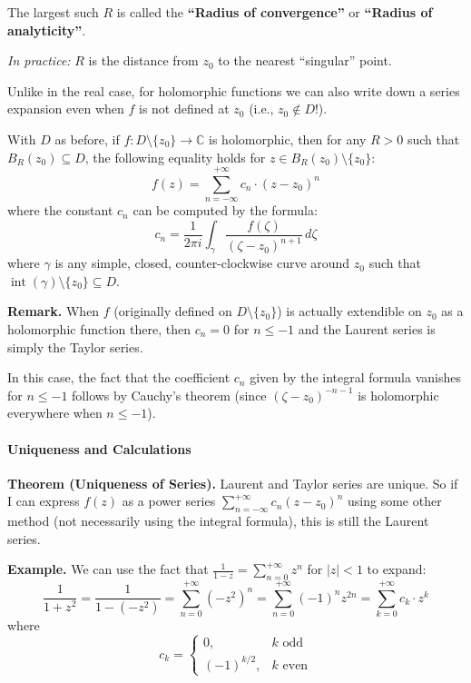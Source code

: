 The largest such $R$ is called the \textbf{``Radius of convergence''} or \textbf{``Radius of analyticity''}. 

\textit{In practice:} $R$ is the distance from $z_0$ to the nearest ``singular'' point.

Unlike in the real case, for holomorphic functions we can also write down a series expansion even when $f$ is not defined at $z_0$ (i.e., $z_0 \notin D$!).

\begin{theorem}
    With $D$ as before, if $f: D \setminus \{z_0\} \longrightarrow \mathbb{C}$ is holomorphic, then for any $R > 0$ such that $B_R(z_0) \subseteq D$, the following equality holds for $z \in B_R(z_0) \setminus \{z_0\}$:
    \[
        f(z) = \sum_{n=-\infty}^{+\infty} c_n \cdot (z-z_0)^n
    \]
    where the constant $c_n$ can be computed by the formula:
    \[
        c_n = \frac{1}{2\pi i} \int_{\gamma} \frac{f(\zeta)}{(\zeta-z_0)^{n+1}} \, d\zeta
    \]
    where $\gamma$ is any simple, closed, counter-clockwise curve around $z_0$ such that $\operatorname{int}(\gamma) \setminus \{z_0\} \subseteq D$.
\end{theorem}

\noindent\textbf{Remark.} When $f$ (originally defined on $D \setminus \{z_0\}$) is actually extendible on $z_0$ as a holomorphic function there, then $c_n = 0$ for $n \le -1$ and the Laurent series is simply the Taylor series.

In this case, the fact that the coefficient $c_n$ given by the integral formula vanishes for $n \le -1$ follows by Cauchy's theorem (since $(\zeta-z_0)^{-n-1}$ is holomorphic everywhere when $n \le -1$).

\paragraph{Uniqueness and Calculations}

\noindent\textbf{Theorem (Uniqueness of Series).} Laurent and Taylor series are unique. So if I can express $f(z)$ as a power series $\sum_{n=-\infty}^{+\infty} c_n(z-z_0)^n$ using some other method (not necessarily using the integral formula), this is still the Laurent series.

\medskip
\noindent\textbf{Example.} We can use the fact that $\frac{1}{1-z} = \sum_{n=0}^{+\infty} z^n$ for $|z| < 1$ to expand:
\[
    \frac{1}{1+z^2} = \frac{1}{1-(-z^2)} = \sum_{n=0}^{+\infty} (-z^2)^n = \sum_{n=0}^{+\infty} (-1)^n z^{2n} = \sum_{k=0}^{+\infty} c_k \cdot z^k
\]
where
\[
    c_k = 
    \begin{cases} 
        0, & k \text{ odd} \\ 
        (-1)^{k/2}, & k \text{ even} 
    \end{cases}
\]

